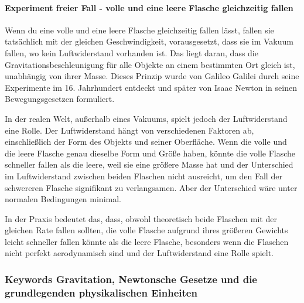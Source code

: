 \documentclass{vorlage-design-main}
\begin{document}
\hypertarget{experiment-freier-fall---volle-und-eine-leere-flasche-gleichzeitig-fallen}{%
\paragraph{Experiment freier Fall - volle und eine leere Flasche
gleichzeitig
fallen}\label{experiment-freier-fall---volle-und-eine-leere-flasche-gleichzeitig-fallen}}

Wenn du eine volle und eine leere Flasche gleichzeitig fallen lässt,
fallen sie tatsächlich mit der gleichen Geschwindigkeit, vorausgesetzt,
dass sie im Vakuum fallen, wo kein Luftwiderstand vorhanden ist. Das
liegt daran, dass die Gravitationsbeschleunigung für alle Objekte an
einem bestimmten Ort gleich ist, unabhängig von ihrer Masse. Dieses
Prinzip wurde von Galileo Galilei durch seine Experimente im 16.
Jahrhundert entdeckt und später von Isaac Newton in seinen
Bewegungsgesetzen formuliert.

In der realen Welt, außerhalb eines Vakuums, spielt jedoch der
Luftwiderstand eine Rolle. Der Luftwiderstand hängt von verschiedenen
Faktoren ab, einschließlich der Form des Objekts und seiner Oberfläche.
Wenn die volle und die leere Flasche genau dieselbe Form und Größe
haben, könnte die volle Flasche schneller fallen als die leere, weil sie
eine größere Masse hat und der Unterschied im Luftwiderstand zwischen
beiden Flaschen nicht ausreicht, um den Fall der schwereren Flasche
signifikant zu verlangsamen. Aber der Unterschied wäre unter normalen
Bedingungen minimal.

In der Praxis bedeutet das, dass, obwohl theoretisch beide Flaschen mit
der gleichen Rate fallen sollten, die volle Flasche aufgrund ihres
größeren Gewichts leicht schneller fallen könnte als die leere Flasche,
besonders wenn die Flaschen nicht perfekt aerodynamisch sind und der
Luftwiderstand eine Rolle spielt.

\hypertarget{keywords-gravitation-newtonsche-gesetze-und-die-grundlegenden-physikalischen-einheiten}{%
\subsubsection{Keywords Gravitation, Newtonsche Gesetze und die
grundlegenden physikalischen
Einheiten}\label{keywords-gravitation-newtonsche-gesetze-und-die-grundlegenden-physikalischen-einheiten}}
\end{document}
